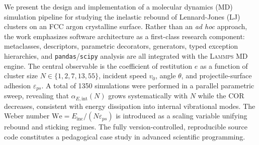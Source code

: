 We present the design and implementation of a molecular dynamics (MD)
simulation pipeline for studying the inelastic rebound of Lennard-Jones (LJ)
clusters on an FCC argon crystalline surface. Rather than an \textit{ad hoc}
approach, the work emphasizes software architecture as a first-class research
component: metaclasses, descriptors, parametric decorators, generators, typed
exception hierarchies, and \texttt{pandas}/\texttt{scipy} analysis are all
integrated with the \textsc{Lammps} MD engine. The central observable is the
coefficient of restitution $e$ as a function of cluster size
$N\in\{1,2,7,13,55\}$, incident speed $v_0$, angle $\theta$, and
projectile-surface adhesion $\varepsilon_{ps}$. A total of \num{1350}
simulations were performed in a parallel parametric sweep, revealing that
$\alpha_{E,\mathrm{int}}(N)$ grows systematically with $N$ while the COR
decreases, consistent with energy dissipation into internal vibrational modes.
The Weber number $\mathrm{We}=E_{\mathrm{inc}}/(N\varepsilon_{ps})$ is
introduced as a scaling variable unifying rebound and sticking regimes. The
fully version-controlled, reproducible source code constitutes a pedagogical
case study in advanced scientific programming.
